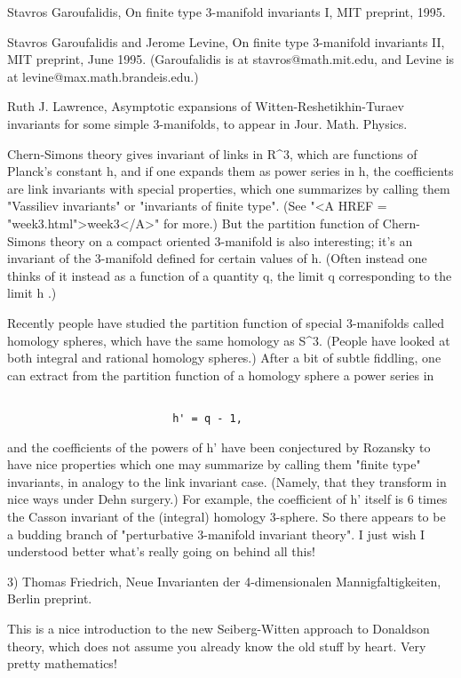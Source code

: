 Stavros Garoufalidis, On finite type 3-manifold invariants I, MIT preprint,
1995.

Stavros Garoufalidis and Jerome Levine, On finite type 3-manifold
invariants II, MIT preprint, June 1995.   (Garoufalidis is at 
stavros@math.mit.edu, and Levine is at levine@max.math.brandeis.edu.)

Ruth J. Lawrence, Asymptotic expansions of Witten-Reshetikhin-Turaev 
invariants for some simple 3-manifolds, to appear in Jour. Math. Physics.

Chern-Simons theory gives invariant of links in R^3, which are functions
of Planck's constant h, and if one expands them as power series in h,
the coefficients are link invariants with special properties, which one 
summarizes by calling them "Vassiliev invariants" or "invariants of 
finite type".  (See "<A HREF = "week3.html">week3</A>" for more.)   But the partition function of 
Chern-Simons theory on a compact oriented 3-manifold is also interesting; 
it's an invariant of the 3-manifold defined for certain values of h. 
(Often instead one thinks of it instead as a function of a quantity q, 
the limit q  corresponding to the limit h .)  

Recently people have studied the partition function of special 3-manifolds 
called homology spheres, which have the same homology as S^3.  (People have 
looked at both integral and rational homology spheres.)   After a bit of 
subtle fiddling, one can extract from the partition function of a homology 
sphere a power series in 


\begin{verbatim}

                          h' = q - 1,
\end{verbatim}
    

and the coefficients of the powers of h' have been conjectured by
Rozansky to have nice properties which one may summarize by calling them
"finite type" invariants, in analogy to the link invariant case.
(Namely, that they transform in nice ways under Dehn surgery.)  For
example, the coefficient of h' itself is 6 times the Casson invariant of
the (integral) homology 3-sphere.  So there appears to be a budding
branch of "perturbative 3-manifold invariant theory".  I just wish I
understood better what's really going on behind all this!

3) Thomas Friedrich, Neue Invarianten der 4-dimensionalen Mannigfaltigkeiten,
Berlin preprint.  

This is a nice introduction to the new Seiberg-Witten approach to Donaldson
theory, which does not assume you already know the old stuff by heart.  Very
pretty mathematics!


